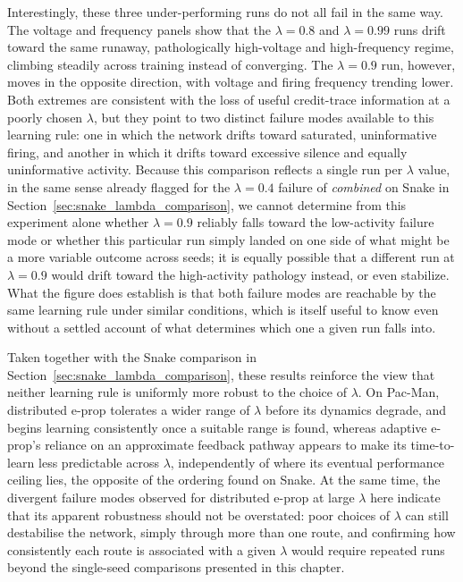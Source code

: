 Interestingly, these three under-performing runs do not all fail in the
same way. The voltage and frequency panels show that the $\lambda = 0.8$
and $\lambda = 0.99$ runs drift toward the same runaway, pathologically
high-voltage and high-frequency regime, climbing steadily across training
instead of converging. The $\lambda = 0.9$ run, however, moves in the
opposite direction, with voltage and firing frequency trending lower. 
Both extremes are consistent with the 
loss of useful credit-trace information at a poorly
chosen $\lambda$, but they point to two distinct failure modes available
to this learning rule: one in which the network drifts toward saturated,
uninformative firing, and another in which it drifts toward excessive
silence and equally uninformative activity. Because this comparison
reflects a single run per $\lambda$ value, in the same sense already
flagged for the $\lambda = 0.4$ failure of \emph{combined} on Snake in
Section~\ref{sec:snake_lambda_comparison}, we cannot determine from this
experiment alone whether $\lambda = 0.9$ reliably falls toward the
low-activity failure mode or whether this particular run simply landed on
one side of what might be a more variable outcome across seeds; it is
equally possible that a different run at $\lambda = 0.9$ would drift
toward the high-activity pathology instead, or even stabilize.
What the figure does establish is that both failure modes are reachable by
the same learning rule under similar conditions, which is itself useful to
know even without a settled account of what determines which one a given
run falls into.

Taken together with the Snake comparison in
Section~\ref{sec:snake_lambda_comparison}, these results reinforce the
view that neither learning rule is uniformly more robust to the choice of
$\lambda$. On Pac-Man, distributed e-prop tolerates a wider range of
$\lambda$ before its dynamics degrade, and begins learning consistently
once a suitable range is found, whereas adaptive e-prop's reliance on an
approximate feedback pathway appears to make its time-to-learn less
predictable across $\lambda$, independently of where its eventual
performance ceiling lies, the opposite of the ordering found on Snake. At
the same time, the divergent failure modes observed for distributed e-prop
at large $\lambda$ here indicate that its apparent robustness should not
be overstated: poor choices of $\lambda$ can still destabilise the
network, simply through more than one route, and confirming how
consistently each route is associated with a given $\lambda$ would require
repeated runs beyond the single-seed comparisons presented in this
chapter.

